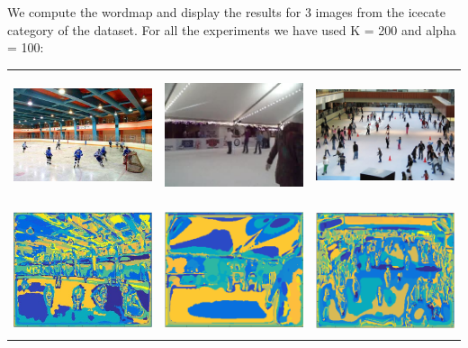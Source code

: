 \documentclass[12pt]{article}
\newenvironment{problem}[2][Problem]{\begin{trivlist}
\item[\hskip \labelsep {\bfseries #1}\hskip \labelsep {\bfseries #2.}]}{\end{trivlist}}
\begin{document}
\newpage
\begin{problem}{1.3}
We compute the wordmap and display the results for 3 images from the icecate category of the dataset. For all the experiments we have used K = 200 and alpha = 100:

\begin{table}[htb]

\begin{tabular}{c c c}
   \includegraphics[width=55mm,height=37mm]{images/4_o} &
   \includegraphics[width=55mm,height=37mm]{images/5_o} &
   \includegraphics[width=55mm,height=37mm]{images/6_o}\\
   
   \includegraphics[width=55mm,height=37mm]{images/4} &
   \includegraphics[width=55mm,height=37mm]{images/5} &
   \includegraphics[width=55mm,height=37mm]{images/6}\\
\end{tabular}


\end{table}
\end{problem}
\end{document}
